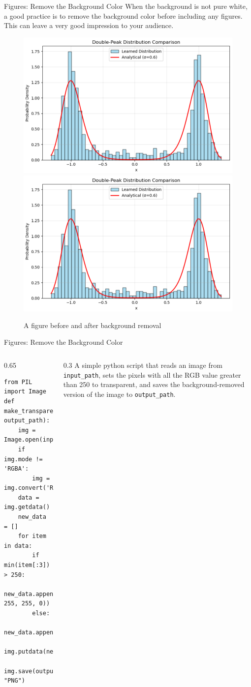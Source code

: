 \documentclass[12pt, aspectratio=169]{beamer}
\begin{document}
\begin{frame}{Figures: Remove the Background Color}
When the background is not pure white, a good practice is to remove the background color before including any figures. This can leave a very good impression to your audience. 
\begin{figure}
    \centering
    \includegraphics[width=0.4\linewidth]{template-source/double_peak_fig.png}\hspace{0.05\linewidth}
    \includegraphics[width=0.4\linewidth]{template-source/double_peak_fig_rmbg.png}
    \caption{A figure before and after background removal}
    \label{fig:doublepeakbd}
\end{figure}
\end{frame}

\begin{frame}[fragile]{Figures: Remove the Background Color}
\begin{columns}
\begin{column}{0.65\linewidth}
\begin{lstlisting}[style=python]
from PIL import Image
def make_transparent(input_path, output_path):
    img = Image.open(input_path)
    if img.mode != 'RGBA':
        img = img.convert('RGBA')
    data = img.getdata()
    new_data = []
    for item in data:
        if min(item[:3]) > 250:
            new_data.append((255, 255, 255, 0))
        else:
            new_data.append(item)
    img.putdata(new_data)
    img.save(output_path, "PNG")
\end{lstlisting}
\end{column}
\begin{column}{0.3\linewidth}\justifying
A simple python script that reads an image from \verb|input_path|, sets the pixels with all the RGB value greater than 250 to transparent, and saves the background-removed version of the image to \verb|output_path|.
\end{column}
\end{columns}

\end{frame}
\end{document}
